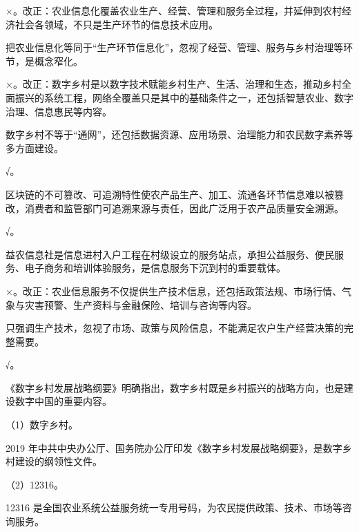 \documentclass[a4paper,11pt]{article}
\begin{document}

\q ×。改正：农业信息化覆盖农业生产、经营、管理和服务全过程，并延伸到农村经济社会各领域，不只是生产环节的信息技术应用。\begin{analysis}把农业信息化等同于“生产环节信息化”，忽视了经营、管理、服务与乡村治理等环节，是概念窄化。\end{analysis}

\q ×。改正：数字乡村是以数字技术赋能乡村生产、生活、治理和生态，推动乡村全面振兴的系统工程，网络全覆盖只是其中的基础条件之一，还包括智慧农业、数字治理、信息惠民等内容。\begin{analysis}数字乡村不等于“通网”，还包括数据资源、应用场景、治理能力和农民数字素养等多方面建设。\end{analysis}

\q √。\begin{analysis}区块链的不可篡改、可追溯特性使农产品生产、加工、流通各环节信息难以被篡改，消费者和监管部门可追溯来源与责任，因此广泛用于农产品质量安全溯源。\end{analysis}

\q √。\begin{analysis}益农信息社是信息进村入户工程在村级设立的服务站点，承担公益服务、便民服务、电子商务和培训体验服务，是信息服务下沉到村的重要载体。\end{analysis}

\q ×。改正：农业信息服务不仅提供生产技术信息，还包括政策法规、市场行情、气象与灾害预警、生产资料与金融保险、培训与咨询等内容。\begin{analysis}只强调生产技术，忽视了市场、政策与风险信息，不能满足农户生产经营决策的完整需要。\end{analysis}

\q √。\begin{analysis}《数字乡村发展战略纲要》明确指出，数字乡村既是乡村振兴的战略方向，也是建设数字中国的重要内容。\end{analysis}


\q （1）数字乡村。\begin{analysis}2019 年中共中央办公厅、国务院办公厅印发《数字乡村发展战略纲要》，是数字乡村建设的纲领性文件。\end{analysis}

\q （2）12316。\begin{analysis}12316 是全国农业系统公益服务统一专用号码，为农民提供政策、技术、市场等咨询服务。\end{analysis}
\end{document}

